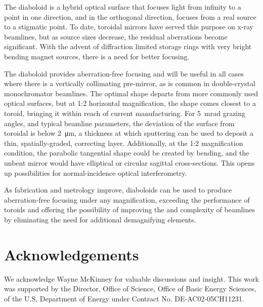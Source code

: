 \documentclass[preprint]{iucr}       %
\begin{document}
The diaboloid is a hybrid optical surface that focuses light from infinity to a point in one direction, and in the orthogonal direction, focuses from a real source to a stigmatic point. To date, toroidal mirrors have served this purpose on x-ray beamlines, but as source sizes decrease, the residual aberrations become significant. With the advent of diffraction limited storage rings with very bright bending magnet sources, there is a need for better focusing. 

The diaboloid provides aberration-free focusing and will be useful in all cases where there is a vertically collimating pre-mirror, as is common in double-crystal monochromator beamlines. The optimal shape departs from more commonly used optical surfaces, but at 1:2 horizontal magnification, the shape comes closest to a toroid, bringing it within reach of current manufacturing.
For \SI{5}{\milli\radian} grazing angles, and typical beamline parameters, the deviation of the surface from toroidal is below \SI{2}{\micro\meter}, a thickness at which sputtering can be used to deposit a thin, spatially-graded, correcting layer. Additionally, at the 1:2 magnification condition, the parabolic tangential shape could be created by bending, and the unbent mirror would have elliptical or circular sagittal cross-sections. This opens up possibilities for normal-incidence optical interferometry.

As fabrication and metrology improve, diaboloids can be used to produce aberration-free focusing under any magnification, exceeding the performance of toroids and offering the possibility of improving the  and complexity of beamlines by eliminating the need for additional demagnifying elements. 




\vspace{5mm}
\section{Acknowledgements}    
 
We acknowledge Wayne McKinney for valuable discussions and insight.
This work was supported by the Director, Office of Science, Office of Basic Energy Sciences, of the U.S. Department of Energy under Contract No. DE-AC02-05CH11231.
\end{document}
